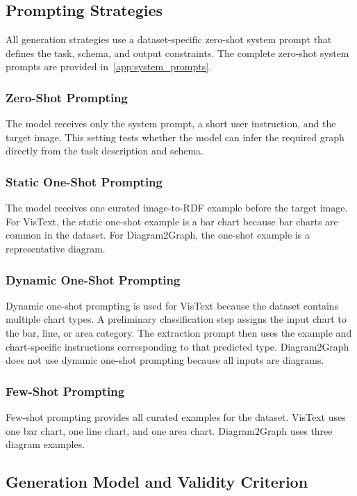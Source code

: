 \documentclass[preprint,12pt]{elsarticle}
\begin{document}
\subsection{Prompting Strategies}\label{subsec:prompting}

All generation strategies use a dataset-specific zero-shot system prompt that defines the task, schema, and output constraints. The complete zero-shot system prompts are provided in~\ref{app:system_prompts}.

\subsubsection{Zero-Shot Prompting}
The model receives only the system prompt, a short user instruction, and the target image. This setting tests whether the model can infer the required graph directly from the task description and schema.

\subsubsection{Static One-Shot Prompting}
The model receives one curated image-to-RDF example before the target image. For VisText, the static one-shot example is a bar chart because bar charts are common in the dataset. For Diagram2Graph, the one-shot example is a representative diagram.

\subsubsection{Dynamic One-Shot Prompting}
Dynamic one-shot prompting is used for VisText because the dataset contains multiple chart types. A preliminary classification step assigns the input chart to the bar, line, or area category. The extraction prompt then uses the example and chart-specific instructions corresponding to that predicted type. Diagram2Graph does not use dynamic one-shot prompting because all inputs are diagrams.

\subsubsection{Few-Shot Prompting}
Few-shot prompting provides all curated examples for the dataset. VisText uses one bar chart, one line chart, and one area chart. Diagram2Graph uses three diagram examples.

\subsection{Generation Model and Validity Criterion}
\end{document}
